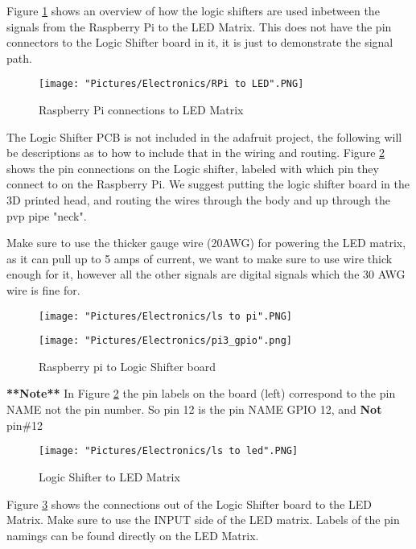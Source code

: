 \documentclass[12pt]{article}
\begin{document}
Figure \ref{rpi2led} shows an overview of how the logic shifters are used inbetween the signals from the Raspberry Pi to the LED Matrix. This does not have the pin connectors to the Logic Shifter board in it, it is just to demonstrate the signal path.

\begin{figure}[H]
 	\centering
	\texttt{[image: "Pictures/Electronics/RPi to LED".PNG]}
 	\caption{Raspberry Pi connections to LED Matrix}
	\label{rpi2led}
\end{figure}


\noindent The Logic Shifter PCB is not included in the adafruit project, the following will be descriptions as to how to include that in the wiring and routing. Figure \ref{ls2pi} shows the pin connections on the Logic shifter, labeled with which pin they connect to on the Raspberry Pi. We suggest putting the logic shifter board in the 3D printed head, and routing the wires through the body and up through the pvp pipe "neck". 

\noindent Make sure to use the thicker gauge wire (20AWG) for powering the LED matrix, as it can pull up to 5 amps of current, we want to make sure to use wire thick enough for it, however all the other signals are digital signals which the 30 AWG wire is fine for. 

\begin{figure}[H]
 	\centering
  	\begin{minipage}[b]{0.45\textwidth}
		\texttt{[image: "Pictures/Electronics/ls to pi".PNG]}
  	\end{minipage}
  	\hfill
  	\begin{minipage}[b]{0.45\textwidth}
    		\texttt{[image: "Pictures/Electronics/pi3\_gpio".png]}
  	\end{minipage}
	\caption{Raspberry pi to Logic Shifter board}
	\label{ls2pi}
\end{figure}

\textbf{**Note**} In Figure \ref{ls2pi} the pin labels on the board (left) correspond to the pin NAME not the pin number. So pin 12 is the pin NAME GPIO 12, and \textbf{Not} pin\#12 

\begin{figure}[H]
 	\centering
	\texttt{[image: "Pictures/Electronics/ls to led".PNG]}
 	\caption{Logic Shifter to LED Matrix}
	\label{ls2led}
\end{figure}

Figure \ref{ls2led} shows the connections out of the Logic Shifter board to the LED Matrix. Make sure to use the INPUT side of the LED matrix. Labels of the pin namings can be found directly on the LED Matrix.  
\end{document}
